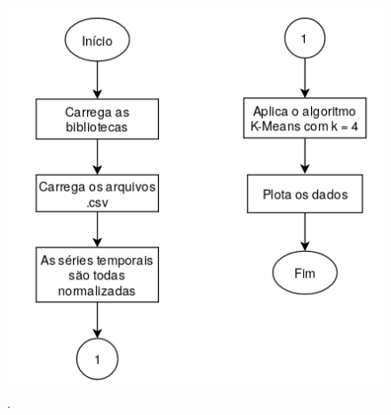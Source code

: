 \begin{figure}[H]
    \caption{.}
    \begin{center}
        \includegraphics[scale=.65]{metodologia/img/k-means.png}
    \end{center}
    \label{fig:}
\end{figure}